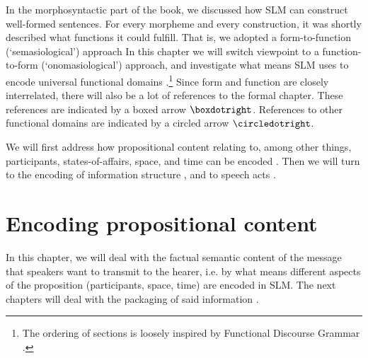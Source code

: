 




In the morphosyntactic part of the book, we discussed how SLM can construct well-formed sentences. For every morpheme and every construction, it was shortly described what functions it could fulfill. That is, we adopted a form-to-function (`semasiological') approach In this chapter we will switch viewpoint to a function-to-form (`onomasiological') approach, and investigate what means SLM uses to encode universal functional domains \citep{Givon2001a,Givon2001b}.\footnote{The ordering
	of sections is loosely inspired by Functional Discourse Grammar \citep{HengeveldEtAl2008fdg}.}
Since form and function are closely interrelated, there will also be a lot of references to the formal chapter. These references are indicated by a boxed arrow $\boxdotright$. References to other functional domains are indicated by a circled arrow $\circledotright$.

We will first address how propositional content relating to, among other things, participants, states-of-affairs, space, and time can be encoded . Then we will turn to the encoding of information structure , and to speech acts .

\chapter{Encoding propositional content}\label{sec:func:FunctionalDomains}
In this chapter, we will deal with the factual semantic content of the message  that speakers want to transmit to the hearer, i.e. by what means different aspects of the proposition (participants, space, time) are encoded in SLM. The next chapters will deal with the packaging of said information .

